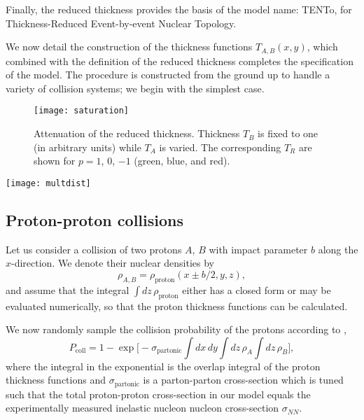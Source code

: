 \documentclass[aps,prl,reprint,amsmath,nofootinbib]{revtex4-1}
\newcommand{\trento}{T\raisebox{-.5ex}{R}ENTo}
\newcommand{\needcite}{\textbf{[???]}}
\begin{document}
Finally, the reduced thickness provides the basis of the model name:
\trento, for Thickness-Reduced Event-by-event Nuclear Topology.

We now detail the construction of the thickness functions $T_{A,B}(x, y)$, which combined with the definition
of the reduced thickness completes the specification of the model.  The procedure is constructed from the
ground up to handle a variety of collision systems; we begin with the simplest case.

\begin{figure}[t]
  \texttt{[image: saturation]}
  \caption{
    \label{fig:saturation}
    Attenuation of the reduced thickness.  Thickness $T_B$ is fixed to one (in arbitrary units) while $T_A$ is
    varied.  The corresponding $T_R$ are shown for $p = 1$, 0, $-1$ (green, blue, and red).
  }
\end{figure}

\begin{figure*}[t]
  \texttt{[image: multdist]}
  \caption{
    \label{fig:multdist}
    Multiplicity distributions for proton-proton, proton-lead, and lead-lead collisions.  The blue histograms
    are \protect\trento\ results from $10^6$ minimum-bias events for each collision system, all with reduced
    thickness parameter $p = 0$ (geometric mean) and gamma fluctuation parameter $k = 0.8$.  The normalization
    constants indicated in the legends are set so that the model and experimental distributions (points with
    error bars) have the same mean.  Experimental data are from ALICE \needcite.
  }
\end{figure*}

\subsection{Proton-proton collisions}

Let us consider a collision of two protons $A$, $B$ with impact parameter $b$ along the $x$-direction.
We denote their nuclear densities by
\begin{equation}
  \rho_{A,B} = \rho_\text{proton}(x \pm b/2, y, z),
\end{equation}
and assume that the integral $\int dz \, \rho_\text{proton}$ either has a closed form or may be
evaluated numerically, so that the proton thickness functions can be calculated.

We now randomly sample the collision probability of the protons according to \cite{dEnterria:2010hd},
\begin{equation}
  P_\text{coll} = 1 - \exp\biggl[ -\sigma_{\mathrm{partonic}} \int dx \, dy \int dz \, \rho_A \int dz \, \rho_B \biggr],
  \label{eq:pcoll}
\end{equation}
where the integral in the exponential is the overlap integral of the proton thickness functions and
$\sigma_{\mathrm{partonic}}$ is a parton-parton cross-section which is tuned such that the total proton-proton 
cross-section in our model equals the experimentally measured inelastic nucleon nucleon cross-section $\sigma_{NN}$.
\end{document}
